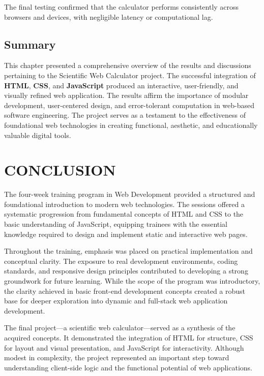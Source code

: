 \documentclass[a4paper,12pt,oneside]{report}
\numberwithin{equation}{chapter}
\numberwithin{figure}{chapter}
\numberwithin{table}{chapter}
\begin{document}
The final testing confirmed that the calculator performs consistently across browsers and devices, with negligible latency or computational lag.

\section{Summary}

This chapter presented a comprehensive overview of the results and discussions pertaining to the Scientific Web Calculator project. The successful integration of \textbf{HTML}, \textbf{CSS}, and \textbf{JavaScript} produced an interactive, user-friendly, and visually refined web application. The results affirm the importance of modular development, user-centered design, and error-tolerant computation in web-based software engineering. The project serves as a testament to the effectiveness of foundational web technologies in creating functional, aesthetic, and educationally valuable digital tools.

\newpage
\chapter{CONCLUSION}

The four-week training program in Web Development provided a structured and foundational introduction to modern web technologies. The sessions offered a systematic progression from fundamental concepts of HTML and CSS to the basic understanding of JavaScript, equipping trainees with the essential knowledge required to design and implement static and interactive web pages. 

Throughout the training, emphasis was placed on practical implementation and conceptual clarity. The exposure to real development environments, coding standards, and responsive design principles contributed to developing a strong groundwork for future learning. While the scope of the program was introductory, the clarity achieved in basic front-end development concepts created a robust base for deeper exploration into dynamic and full-stack web application development.

The final project—a scientific web calculator—served as a synthesis of the acquired concepts. It demonstrated the integration of HTML for structure, CSS for layout and visual presentation, and JavaScript for interactivity. Although modest in complexity, the project represented an important step toward understanding client-side logic and the functional potential of web applications.
\end{document}
